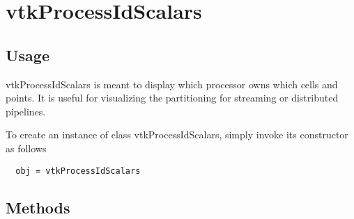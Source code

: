 \section{vtkProcessIdScalars}

\subsection{Usage}

 vtkProcessIdScalars is meant to display which processor owns which cells
 and points.  It is useful for visualizing the partitioning for
 streaming or distributed pipelines.


To create an instance of class vtkProcessIdScalars, simply
invoke its constructor as follows
\begin{verbatim}
  obj = vtkProcessIdScalars
\end{verbatim}
\subsection{Methods}

